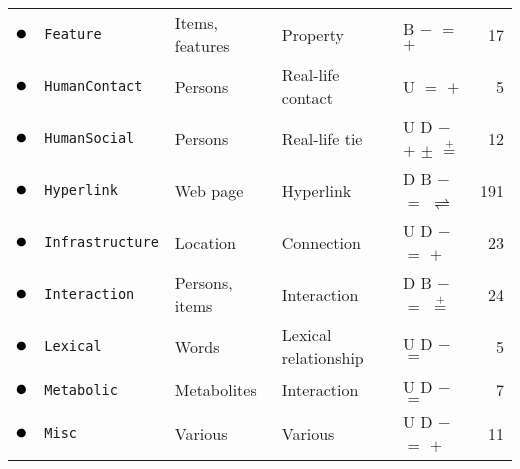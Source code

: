 \begin{tabular}{lllllr}
\textcolor{colorFeature}{$\newmoon$} &\texttt{Feature} & Items, features & Property & \phantom{U} \phantom{D} B $-$ $=$ $+$ \phantom{$\pm$} \phantom{$\stackrel{+}{=}$} \phantom{$*$} \phantom{$_*{}^*$} \phantom{$\rightleftharpoons$} \phantom{$++$}  &  17\\
\textcolor{colorHumanContact}{$\newmoon$} &\texttt{HumanContact} & Persons & Real-life contact & U \phantom{D} \phantom{B} \phantom{$-$} $=$ $+$ \phantom{$\pm$} \phantom{$\stackrel{+}{=}$} \phantom{$*$} \phantom{$_*{}^*$} \phantom{$\rightleftharpoons$} \phantom{$++$}  &  5\\
\textcolor{colorHumanSocial}{$\newmoon$} &\texttt{HumanSocial} & Persons & Real-life tie & U D \phantom{B} $-$ \phantom{$=$} $+$ $\pm$ $\stackrel{+}{=}$ \phantom{$*$} \phantom{$_*{}^*$} \phantom{$\rightleftharpoons$} \phantom{$++$}  &  12\\
\textcolor{colorHyperlink}{$\newmoon$} &\texttt{Hyperlink} & Web page & Hyperlink & \phantom{U} D B $-$ $=$ \phantom{$+$} \phantom{$\pm$} \phantom{$\stackrel{+}{=}$} \phantom{$*$} \phantom{$_*{}^*$} $\rightleftharpoons$ \phantom{$++$}  &  191\\
\textcolor{colorInfrastructure}{$\newmoon$} &\texttt{Infrastructure} & Location & Connection & U D \phantom{B} $-$ $=$ $+$ \phantom{$\pm$} \phantom{$\stackrel{+}{=}$} \phantom{$*$} \phantom{$_*{}^*$} \phantom{$\rightleftharpoons$} \phantom{$++$}  &  23\\
\textcolor{colorInteraction}{$\newmoon$} &\texttt{Interaction} & Persons, items & Interaction & \phantom{U} D B $-$ $=$ \phantom{$+$} \phantom{$\pm$} $\stackrel{+}{=}$ \phantom{$*$} \phantom{$_*{}^*$} \phantom{$\rightleftharpoons$} \phantom{$++$}  &  24\\
\textcolor{colorLexical}{$\newmoon$} &\texttt{Lexical} & Words & Lexical relationship & U D \phantom{B} $-$ $=$ \phantom{$+$} \phantom{$\pm$} \phantom{$\stackrel{+}{=}$} \phantom{$*$} \phantom{$_*{}^*$} \phantom{$\rightleftharpoons$} \phantom{$++$}  &  5\\
\textcolor{colorMetabolic}{$\newmoon$} &\texttt{Metabolic} & Metabolites & Interaction & U D \phantom{B} $-$ $=$ \phantom{$+$} \phantom{$\pm$} \phantom{$\stackrel{+}{=}$} \phantom{$*$} \phantom{$_*{}^*$} \phantom{$\rightleftharpoons$} \phantom{$++$}  &  7\\
\textcolor{colorMisc}{$\newmoon$} &\texttt{Misc} & Various & Various & U D \phantom{B} $-$ $=$ $+$ \phantom{$\pm$} \phantom{$\stackrel{+}{=}$} \phantom{$*$} \phantom{$_*{}^*$} \phantom{$\rightleftharpoons$} \phantom{$++$}  &  11\\

\end{tabular}
